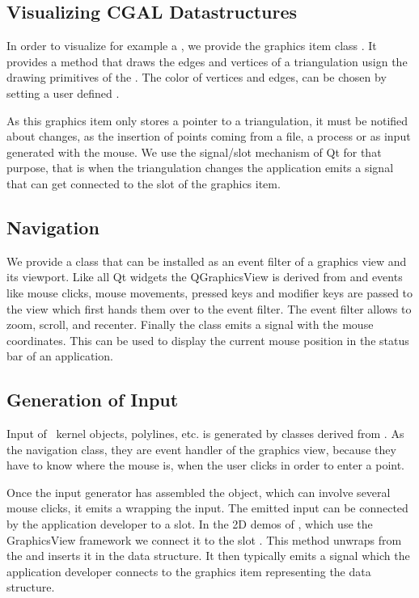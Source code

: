 \subsection{Visualizing CGAL Datastructures}

In order to visualize for example a , we
provide the graphics item class .
It provides a  method that draws the edges and vertices of a triangulation
usign the drawing primitives of the .   The color of vertices and edges, 
can be chosen by setting a user defined  .


As this graphics item only stores a pointer to a triangulation, it
must be notified about changes, as the insertion of points coming from
a file, a process or as input generated with the mouse.  We
use the signal/slot mechanism of Qt for that purpose, that is when the
triangulation changes the application emits a signal that can get connected to the
 slot of the graphics item.



\subsection{Navigation}

We provide a class  that can be installed as an
event filter of a graphics view and its viewport. Like all Qt widgets
the {QGraphicsView} is derived from
 and events like mouse clicks, mouse movements, pressed keys and 
modifier keys are passed to the view which first hands them over to the
event filter.  The  event filter allows to zoom, scroll, and recenter.
Finally the class emits a signal with the mouse coordinates. This can be used
to display the current mouse position in the status bar of an application.

\subsection{Generation of Input}

Input of \cgal\ kernel objects, polylines, etc. is generated by classes derived
from .  As the navigation class, they are event handler of the
graphics view, because they have to know where the mouse is, when the user clicks
in order to enter a point.

Once the input generator has assembled the object, which can involve several mouse clicks,
it emits a  wrapping the input.  The emitted input can be connected
by the application developer to a slot. In the 2D demos of \cgal, which use the 
GraphicsView framework we connect it to the slot .
This method unwraps from the  and inserts it in the data structure. 
It then typically emits a signal  which the application developer 
connects to the graphics item representing the data structure.

